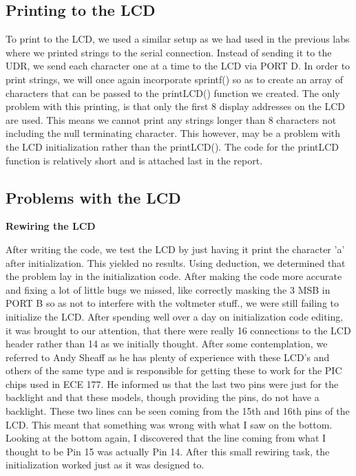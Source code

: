 \subsection{Printing to the LCD}

To  print to the LCD, we used a similar setup as we had used in the previous labs where we printed strings to the serial connection. Instead of sending it to the UDR, we send each character one at a time to the LCD via PORT D. In order to print strings, we will once again incorporate sprintf() so as to create an array of characters that can be passed to the printLCD() function we created. The only problem with this printing, is that only the first 8 display addresses on the LCD are used. This means we cannot print any strings longer than 8 characters not including the null terminating character. This however, may be a problem with the LCD initialization rather than the printLCD(). The code for the printLCD function is relatively short and is attached last in the report.

\subsection{Problems with the LCD}

\textbf{Rewiring the LCD}

After writing the code, we test the LCD by just having it print the character 'a' after initialization. This yielded no results. Using deduction, we determined that the problem lay in the initialization code. After making the code more accurate and fixing a lot of little bugs we missed, like correctly masking the 3 MSB in PORT B so as not to interfere with the voltmeter stuff., we were still failing to initialize the LCD. After spending well over a day on initialization code editing, it was brought to our attention, that there were really 16 connections to the LCD header rather than 14 as we initially thought. After some  contemplation, we referred to Andy Sheaff as he has plenty of experience with these LCD's and others of the same type and is responsible for getting these to work for the PIC chips used in ECE 177.  He informed us that the last two pins were just for the backlight and that these models, though providing the pins, do not have a backlight. These two lines can be seen coming from the 15th and 16th pins of the LCD. This meant that something was wrong with what I saw on the bottom. Looking at the bottom again, I discovered that the line coming from what I thought to be Pin 15 was actually Pin 14. After this small rewiring task, the initialization worked just as it was designed to.

